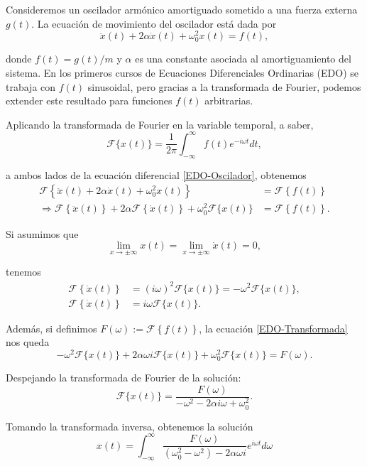 \begin{ejemplo}
  Consideremos un oscilador armónico amortiguado sometido a una fuerza externa $g(t)$. La ecuación de movimiento del oscilador está dada por
\begin{equation}
 \ddot{x}(t) + 2 \alpha \dot{x}(t) + \omega_0^2 x(t) = f(t), \label{EDO-Oscilador}   
\end{equation}

donde $f(t) = g(t)/m$ y $\alpha$ es una constante asociada al amortiguamiento del sistema. En los primeros cursos de Ecuaciones Diferenciales Ordinarias (EDO) se trabaja con $f(t)$ sinusoidal, pero gracias a la transformada de Fourier, podemos extender este resultado para funciones $f(t)$ arbitrarias. 

Aplicando la transformada de Fourier en la variable temporal, a saber,
$$\mathcal{F}\{x(t)\} = \frac{1}{2\pi} \int_{-\infty}^{\infty} f(t) e^{-i\omega t} dt, $$

a ambos lados de la ecuación diferencial \eqref{EDO-Oscilador}, obtenemos 
\begin{align}
    \mathcal{F}\left\{ \ddot{x}(t) + 2 \alpha \dot{x}(t) + \omega_0^2 x(t)\right\} &= \mathcal{F}\left\{ f(t)\right\} \nonumber\\
    \Rightarrow   \mathcal{F}\left\{ \ddot{x}(t) \right\} + 2\alpha \mathcal{F}\left\{ \dot{x}(t) \right\} + \omega_0^2 \mathcal{F}\{x(t)\} &= \mathcal{F}\left\{ f(t)\right\}. \label{EDO-Transformada}
\end{align}

Si asumimos que 
$$\lim_{x \to \pm \infty} x(t) = \lim_{x \to \pm \infty} \dot{x}(t) = 0,$$

tenemos 
\begin{align*}
     \mathcal{F}\left\{ \ddot{x}(t) \right\} &= (i\omega)^2 \mathcal{F}\{x(t)\} = - \omega^2 \mathcal{F}\{x(t)\},\\
      \mathcal{F}\left\{ \dot{x}(t) \right\} &= i \omega \mathcal{F}\{x(t)\}.
\end{align*}

Además, si definimos $F(\omega) := \mathcal{F}\left\{ f(t)\right\}$, la ecuación \eqref{EDO-Transformada} nos queda
$$ - \omega^2 \mathcal{F}\{x(t)\} + 2 \alpha \omega i \mathcal{F}\{x(t)\} + \omega_0^2 \mathcal{F}\{x(t)\} = F(\omega).$$

Despejando la transformada de Fourier de la solución:
$$  \mathcal{F}\{x(t)\} = \frac{F(\omega)}{-\omega^2 - 2 \alpha i \omega + \omega_0^2}.$$

Tomando la transformada inversa, obtenemos la solución 
$$\boxed{x(t) = \int_{-\infty}^{\infty} \frac{F(\omega)}{(\omega_0^2-\omega^2) - 2 \alpha \omega i} e^{i\omega t} d\omega }$$  
\end{ejemplo}


